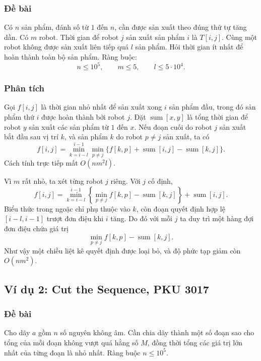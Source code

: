 \documentclass[11pt]{article}
\begin{document}
\subsubsection*{Đề bài}

Có $n$ sản phẩm, đánh số từ $1$ đến $n$, cần được sản xuất theo đúng thứ tự
tăng dần. Có $m$ robot. Thời gian để robot $j$ sản xuất sản phẩm $i$ là
$T[i,j]$. Cùng một robot không được sản xuất liên tiếp quá $l$ sản phẩm. Hỏi
thời gian ít nhất để hoàn thành toàn bộ sản phẩm. Ràng buộc:
\[
  n\le 10^5,\qquad m\le 5,\qquad l\le 5\cdot 10^4.
\]

\subsubsection*{Phân tích}

Gọi $f[i,j]$ là thời gian nhỏ nhất để sản xuất xong $i$ sản phẩm đầu, trong
đó sản phẩm thứ $i$ được hoàn thành bởi robot $j$. Đặt
$\operatorname{sum}[x,y]$ là tổng thời gian để robot $y$ sản xuất các sản phẩm
từ $1$ đến $x$. Nếu đoạn cuối do robot $j$ sản xuất bắt đầu sau vị trí $k$,
và sản phẩm $k$ do robot $p\ne j$ sản xuất, ta có
\[
  f[i,j]=
  \min_{k=i-l}^{i-1}
  \min_{p\ne j}
  \{f[k,p]+\operatorname{sum}[i,j]-\operatorname{sum}[k,j]\}.
\]
Cách tính trực tiếp mất $O(nm^2l)$.

Vì $m$ rất nhỏ, ta xét từng robot $j$ riêng. Với $j$ cố định,
\[
  f[i,j]=
  \min_{k=i-l}^{i-1}
  \left\{\min_{p\ne j} f[k,p]-\operatorname{sum}[k,j]\right\}
  +\operatorname{sum}[i,j].
\]
Biểu thức trong ngoặc chỉ phụ thuộc vào $k$, còn đoạn quyết định hợp lệ
$[i-l,i-1]$ trượt đơn điệu khi $i$ tăng. Do đó với mỗi $j$ ta duy trì một
hàng đợi đơn điệu chứa giá trị
\[
  \min_{p\ne j} f[k,p]-\operatorname{sum}[k,j].
\]
Như vậy một chiều liệt kê quyết định được loại bỏ, và độ phức tạp giảm còn
$O(nm^2)$.

\subsection{Ví dụ 2: Cut the Sequence, PKU 3017}

\subsubsection*{Đề bài}

Cho dãy $a$ gồm $n$ số nguyên không âm. Cần chia dãy thành một số đoạn sao cho
tổng của mỗi đoạn không vượt quá hằng số $M$, đồng thời tổng các giá trị lớn
nhất của từng đoạn là nhỏ nhất. Ràng buộc $n\le 10^5$.
\end{document}
